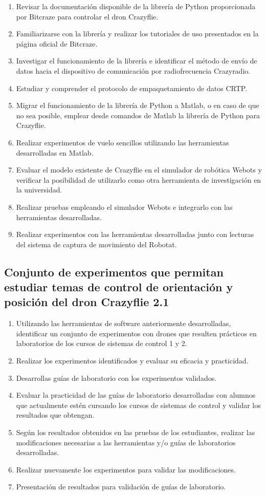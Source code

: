 \begin{enumerate}
	\item Revisar la documentación disponible de la librería de Python proporcionada por Bitcraze para controlar el dron Crazyflie. 
	\item Familiarizarse con la librería y realizar los tutoriales de uso presentados en la página oficial de Bitcraze.
	\item Investigar el funcionamiento de la librería e identificar el método de envío de datos hacia el dispositivo de comunicación por radiofrecuencia Crazyradio. 
	\item Estudiar y comprender el protocolo de empaquetamiento de datos CRTP. 
	\item Migrar el funcionamiento de la librería de Python a Matlab, o en caso de que no sea posible, emplear desde comandos de Matlab la librería de Python para Crazyflie.
	\item Realizar experimentos de vuelo sencillos utilizando las herramientas desarrolladas en Matlab.
	\item Evaluar el modelo existente de Crazyflie en el simulador de robótica Webots y verificar la posibilidad de utilizarlo como otra herramienta de investigación en la universidad.
	\item Realizar pruebas empleando el simulador Webots e integrarlo con las herramientas desarrolladas.
	\item Realizar experimentos con las herramientas desarrolladas junto con lecturas del sistema de captura de movimiento del Robotat.
\end{enumerate}

\subsection*{Conjunto de experimentos que permitan estudiar temas de control de orientación y posición del dron Crazyflie 2.1}

\begin{enumerate}
	\item Utilizando las herramientas de software anteriormente desarrolladas, identificar un conjunto de experimentos con drones que resulten prácticos en laboratorios de los cursos de sistemas de control 1 y 2.
	\item Realizar los experimentos identificados y evaluar su eficacia y practicidad. 
	\item Desarrollas guías de laboratorio con los experimentos validados.
	\item Evaluar la practicidad de las guías de laboratorio desarrolladas con alumnos que actualmente estén cursando los cursos de sistemas de control y validar los resultados que obtengan.
	\item Según los resultados obtenidos en las pruebas de los estudiantes, realizar las modificaciones necesarias a las herramientas y/o guías de laboratorios desarrolladas.
	\item Realizar nuevamente los experimentos para validar las modificaciones.
	\item Presentación de resultados para validación de guías de laboratorio.
\end{enumerate}

